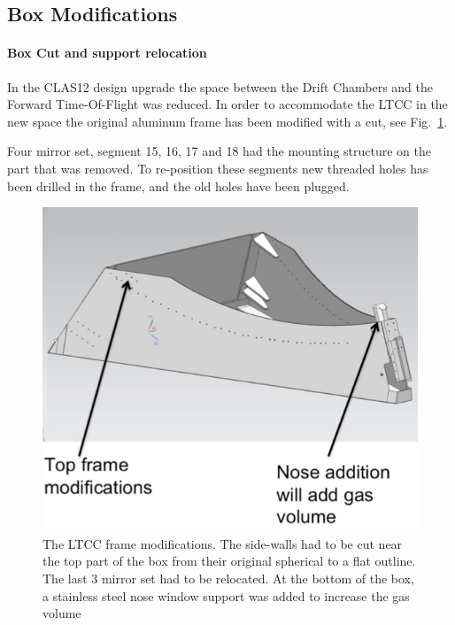 \clearpage\newpage

\subsection{Box Modifications}

\paragraph{Box Cut and support relocation }

In the CLAS12 design upgrade the space between the Drift Chambers and the Forward Time-Of-Flight was reduced.
In order to accommodate the LTCC in the new space the original aluminum frame has been modified with a cut, see Fig.~\ref{fig:boxCut}.

Four mirror set, segment 15, 16, 17 and 18 had the mounting structure on the part that was removed.
To re-position these segments new threaded holes has been drilled in the frame, and the old holes have been plugged.

\begin{figure}[hbt]
	\centering
	\includegraphics[width=1.0\columnwidth,keepaspectratio]{img/boxCut.png}
	\caption{The LTCC frame modifications. The side-walls had to be cut near the top part of the box from their original
            spherical to a flat outline. The last 3 mirror set had to be relocated. At the bottom of the box, a stainless steel
            nose window support was added to increase the gas volume}
	\label{fig:boxCut}
\end{figure}


